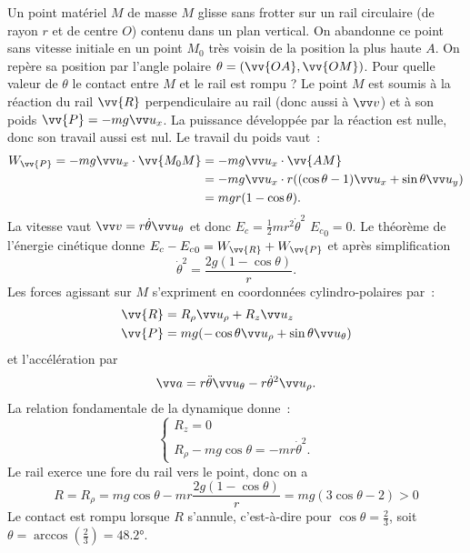 Un point matériel $M$ de masse $M$ glisse sans frotter sur un rail circulaire (de rayon $r$ et de centre $O$) contenu dans un plan vertical. On abandonne ce point sans vitesse initiale en un point $M_0$ très voisin de la position la plus haute $A$. On repère sa position par l'angle polaire $\theta = (\vv{OA}, \vv{OM})$.  Pour quelle valeur de $\theta$ le contact entre $M$ et le rail est rompu ? Le point $M$ est soumis à la réaction du rail $\vv{R}$ perpendiculaire au rail (donc aussi à $\vvv$) et à son poids $\vv{P} = -mg\ux$.  La puissance développée par la réaction est nulle, donc son travail aussi est nul. Le travail du poids vaut~:
\begin{align}
  W_{\vv{P}} = -mg\ux \cdot \vv{M_0M} &= -mg\ux \cdot \vv{AM} \\
  &= -mg\ux \cdot r((\cos\theta -1)\ux + \sin\theta \uy) \\
  &=mgr(1-\cos\theta).
\end{align}
La vitesse vaut $\vvv = r\dot{\theta} \utheta$ et donc $E_c = \frac{1}{2}mr^2\dot{\theta}^2$ ${E_c}_{0}=0$. Le théorème de l'énergie cinétique donne $E_c - {E_c}_{0} = W_{\vv{R}} + W_{\vv{P}}$ et après simplification
\begin{equation}
  \dot{\theta}^2 = \frac{2g(1-\cos\theta)}{r}.
\end{equation}
Les forces agissant sur $M$ s'expriment en coordonnées cylindro-polaires par~:
\begin{align}
  \vv{R} &= R_\rho \urho + R_z \uz \\
  \vv{P} &= mg(-\cos\theta \urho +\sin\theta \utheta)
\end{align}
et l'accélération par
\begin{equation}
  \va = r \ddot{\theta}\utheta -r\dot{\theta}^2\urho.
\end{equation}
La relation fondamentale de la dynamique donne~:
\begin{equation}
  \begin{cases}
    R_z = 0 \\
    R_\rho -mg\cos\theta =-mr\dot{\theta}^2.
  \end{cases}
\end{equation}
Le rail exerce une fore du rail vers le point, donc on a
\begin{equation}
  R=R_\rho = mg\cos\theta - mr \frac{2g(1-\cos\theta)}{r} = mg(3\cos\theta -2)>0
\end{equation}
Le contact est rompu lorsque $R$ s'annule, c'est-à-dire pour $\cos\theta = \frac{2}{3}$, soit $\theta = \arccos\left(\frac{2}{3}\right) = \ang{48.2}$.

